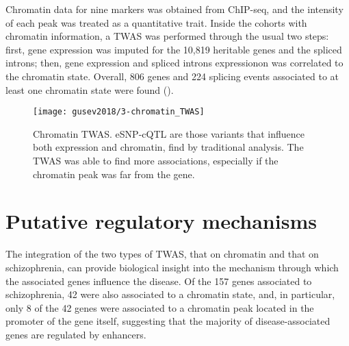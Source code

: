 \documentclass[../main.tex]{subfiles}
\begin{document}
Chromatin data for nine markers was obtained from 
ChIP-seq, and the intensity of each peak was treated as a quantitative trait. 
Inside the cohorts with chromatin information, a TWAS was performed 
through the usual two steps: first, gene expression was imputed for the 
10,819 heritable genes and the spliced introns; then, gene expression 
and spliced introns expressionon was correlated to the chromatin state. 
Overall, 806 genes and 224 splicing events associated to at least one 
chromatin state were found ().

\begin{figure}
	\centering
	\texttt{[image: gusev2018/3-chromatin\_TWAS]}
	\caption{Chromatin TWAS. eSNP-cQTL are those variants that influence 
both expression and chromatin, find by traditional analysis. The TWAS 
was able to find more associations, especially if the chromatin peak was 
far from the gene.}
\end{figure}

\section{Putative regulatory mechanisms}

The integration of the two types of TWAS, that on chromatin and that on 
schizophrenia, can provide biological insight into the mechanism through 
which the associated genes influence the disease. Of the 157 genes 
associated to schizophrenia, 42 were also associated to a chromatin 
state, and, in particular, only 8 of the 42 genes were associated to a 
chromatin peak located in the promoter of the gene itself, suggesting 
that the majority of disease-associated genes are regulated by 
enhancers.
\end{document}
